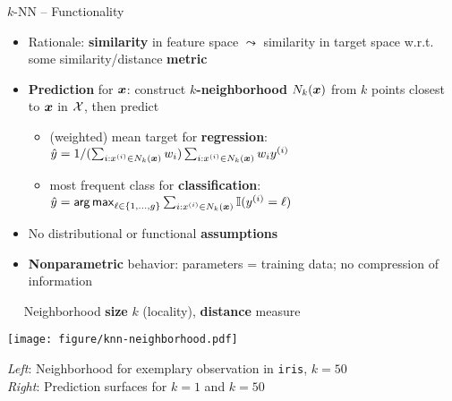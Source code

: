 \begin{frame}{$k$-NN -- Functionality}

 
 

\medskip

\begin{itemize}
  \item Rationale: \textbf{similarity} in feature space $\leadsto$ similarity 
  in target space w.r.t. some similarity/distance \textbf{metric}
  \item \textbf{Prediction} for $\bm{x}$: construct \textbf{$k$-neighborhood} 
  $N_k(\bm{x})$ from $k$ points closest to $\bm{x}$ in $\mathcal{X}$, then 
  predict
  \begin{itemize}
    \footnotesize
    \item (weighted) mean target for \textbf{regression}: $\hat{y} = 1 / 
    (\sum_{i: x^{(i)} \in N_k(\bm{x})} w_i) \sum_{i: x^{(i)} \in N_k(\bm{x})} w_i y^{(i)}$
    \item most frequent class for \textbf{classification}: 
    $\hat{y} = \mathop{\sf arg\,max}_{\ell \in \{1, \ldots, g\}} \sum_{i: x^{(i)} \in N_k(\bm{x})} \mathbb{I}(y^{(i)} = \ell)$
  \end{itemize}
  \item No distributional or functional \textbf{assumptions}
  \item \textbf{Nonparametric} behavior: parameters = training data; no 
  compression of information
\end{itemize}

\medskip

 ~~ Neighborhood \textbf{size} $k$ (locality), 
\textbf{distance} measure

\vfill

\begin{minipage}{0.75\textwidth}
  \texttt{[image: figure/knn-neighborhood.pdf]}
\end{minipage}%
\hfill
\begin{minipage}{0.2\textwidth}
  \tiny
  \raggedright
  \textit{Left}: Neighborhood for exemplary observation in \texttt{iris}, 
  $k = 50$ \\
  \textit{Right}: Prediction surfaces for $k = 1$ and $k = 50$
\end{minipage}
\end{frame}


